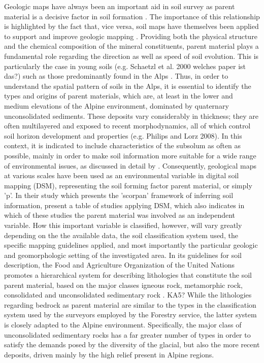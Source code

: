 \documentclass[preprint,12pt,authoryear]{elsarticle}
\begin{document}
Geologic maps have always been an important aid in soil survey as parent material is a decisive factor in soil formation \citep{Jenny1941}. The importance of this relationship is highlighted by the fact that, vice versa, soil maps have themselves been applied to support and improve geologic mapping \citep{Brevik2015}. Providing both the physical structure and the chemical composition of the mineral constituents, parent material plays a fundamental role regarding the direction as well as speed of soil evolution.  This is particularly the case in young soils (e.g. Schaetzl et al. 2000 welches paper ist das?) such as those predominantly found in the Alps \citep{Geitner2017}. Thus, in order to understand the spatial pattern of soils in the Alps, it is essential to identify the types and origins of parent materials, which are, at least in the lower and medium elevations of the Alpine environment, dominated by quaternary unconsolidated sediments. These deposits vary considerably in thickness; they are often multilayered and exposed to recent morphodynamics, all of which control soil horizon development and properties (e.g. Philips and Lorz 2008). In this context, it is indicated to include characteristics of the subsolum as often as possible, mainly in order to make soil information more suitable for a wide range of environmental issues, as discussed in detail by \cite{Juilleret2016}. Consequently, geological maps at various scales have been used as an environmental variable in digital soil mapping (DSM), representing the soil forming factor parent material, or simply 'p'. In their study  which presents the 'scorpan' framework of inferring soil information, \cite{McBratney2003} present a table of studies applying DSM, which also indicates in which of these studies the parent material was involved as an independent variable. How this important variable is classified, however, will vary greatly depending on the the available data, the soil classification system used, the specific mapping guidelines applied, and most importantly the particular geologic and geomorphologic setting of the investigated area. In its guidelines for soil description, the Food and Agriculture Organization of the United Nations promotes a hierarchical system for describing lithologies that constitute the soil parent material, based on the major classes igneous rock, metamorphic rock, consolidated and unconsolidated sedimentary rock \citep{FAO2006}. KA5? While the lithologies regarding bedrock as parent material are similar to the types in the classification system used by the surveyors employed by the Forestry service, the latter system is closely adapted to the Alpine environment. Specifically, the major class of unconsolidated sedimentary rocks has a far greater number of types in order to satisfy the demands posed by the diversity of the glacial, but also the more recent deposits, driven mainly by the high relief present in Alpine regions.
\end{document}

